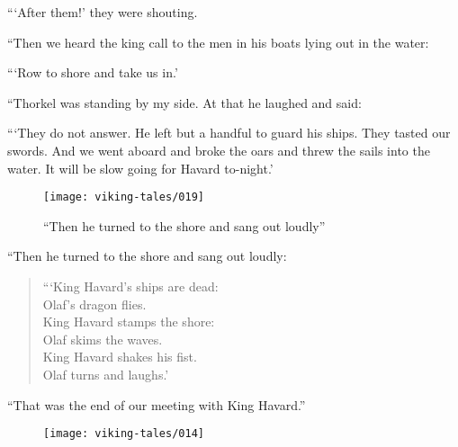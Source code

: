 ```After them!' they were shouting.

``Then we heard the king call to the men in his boats lying out in the
water:

```Row to shore and take us in.'

``Thorkel was standing by my side. At that he laughed and said:

```They do not answer. He left but a handful to guard his ships. They
tasted our swords. And we went aboard and broke the oars and threw the
sails into the water. It will be slow going for Havard to-night.'

\begin{figure}
    \centering
    \texttt{[image: viking-tales/019]}
    \caption{``Then he turned to the shore and sang out loudly''}
\end{figure}

``Then he turned to the shore and sang out loudly:

\begin{quote}
```King Havard's ships are dead:\\
Olaf's dragon flies.\\
King Havard stamps the shore:\\
Olaf skims the waves.\\
King Havard shakes his fist.\\
Olaf turns and laughs.'
\end{quote}

``That was the end of our meeting with King Havard.''

\begin{figure}
    \centering
    \vskip8pt
    \texttt{[image: viking-tales/014]}
\end{figure}
